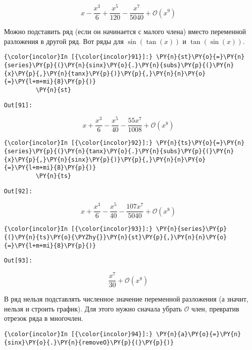     \[x - \frac{x^{3}}{6} + \frac{x^{5}}{120} - \frac{x^{7}}{5040} + \mathcal{O}\left(x^{9}\right)\]

    

    Можно подставить ряд (если он начинается с малого члена) вместо
переменной разложения в другой ряд. Вот ряды для \(\sin(\tan(x))\) и
\(\tan(\sin(x))\).

    \begin{Verbatim}[commandchars=\\\{\}]
{\color{incolor}In [{\color{incolor}91}]:} \PY{n}{st}\PY{o}{=}\PY{n}{series}\PY{p}{(}\PY{n}{sinx}\PY{o}{.}\PY{n}{subs}\PY{p}{(}\PY{n}{x}\PY{p}{,}\PY{n}{tanx}\PY{p}{)}\PY{p}{,}\PY{n}{n}\PY{o}{=}\PY{l+m+mi}{8}\PY{p}{)}
         \PY{n}{st}
\end{Verbatim}
\texttt{\color{outcolor}Out[{\color{outcolor}91}]:}
    
    \[x + \frac{x^{3}}{6} - \frac{x^{5}}{40} - \frac{55 x^{7}}{1008} + \mathcal{O}\left(x^{8}\right)\]

    

    \begin{Verbatim}[commandchars=\\\{\}]
{\color{incolor}In [{\color{incolor}92}]:} \PY{n}{ts}\PY{o}{=}\PY{n}{series}\PY{p}{(}\PY{n}{tanx}\PY{o}{.}\PY{n}{subs}\PY{p}{(}\PY{n}{x}\PY{p}{,}\PY{n}{sinx}\PY{p}{)}\PY{p}{,}\PY{n}{n}\PY{o}{=}\PY{l+m+mi}{8}\PY{p}{)}
         \PY{n}{ts}
\end{Verbatim}
\texttt{\color{outcolor}Out[{\color{outcolor}92}]:}
    
    \[x + \frac{x^{3}}{6} - \frac{x^{5}}{40} - \frac{107 x^{7}}{5040} + \mathcal{O}\left(x^{8}\right)\]

    

    \begin{Verbatim}[commandchars=\\\{\}]
{\color{incolor}In [{\color{incolor}93}]:} \PY{n}{series}\PY{p}{(}\PY{n}{ts}\PY{o}{\PYZhy{}}\PY{n}{st}\PY{p}{,}\PY{n}{n}\PY{o}{=}\PY{l+m+mi}{8}\PY{p}{)}
\end{Verbatim}
\texttt{\color{outcolor}Out[{\color{outcolor}93}]:}
    
    \[\frac{x^{7}}{30} + \mathcal{O}\left(x^{8}\right)\]

    

    В ряд нельзя подставлять численное значение переменной разложения (а
значит, нельзя и строить график). Для этого нужно сначала убрать
\(\mathcal{O}\) член, превратив отрезок ряда в многочлен.

    \begin{Verbatim}[commandchars=\\\{\}]
{\color{incolor}In [{\color{incolor}94}]:} \PY{n}{a}\PY{o}{=}\PY{n}{sinx}\PY{o}{.}\PY{n}{removeO}\PY{p}{(}\PY{p}{)}
\end{Verbatim}


